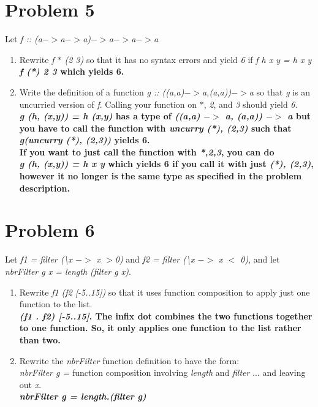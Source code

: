 \documentclass[a4paper, 12pt,fleqn]{article}
\begin{document}
\section*{Problem 5}
Let \textit{f :: (a$->$a$->$a)$->$a$->$a$->$a} 
\begin{enumerate}[label = (\alph*)]
\item Rewrite \textit{f $*$ (2 3)} so that it has no syntax errors and yield \textit{6} if \textit{f h x y = h x y}\\
\textbf{
\textit{f (*) 2 3} which yields 6.
}
\item Write the definition of a function \textit{g :: ((a,a)$->$a,(a,a))$->$a} so that \textit{g} is an uncurried version of \textit{f}. Calling your function on $*$, \textit{2}, and \textit{3} should yield \textit{6}.\\
\textbf{
\textit{g (h, (x,y)) = h (x,y)} has a type of \textit{((a,a) $->$ a, (a,a)) $->$ a} but you have to call the function with \textit{uncurry (*), (2,3)} such that \textit{g(uncurry (*), (2,3))} yields 6.\\
If you want to just call the function with \textit{*,2,3}, you can do\\ \textit{g (h, (x,y)) = h x y} which yields 6 if you call it with just \textit{(*), (2,3)}, however it no longer is the same type as specified in the problem description.
}
\end{enumerate}
\section*{Problem 6}
Let \textit{f1 = filter (\textbackslash x $->$ x $>$0)} and \textit{f2 = filter (\textbackslash x $->$ x $<$ 0)}, and let \\\textit{nbrFilter g x = length (filter g x)}.
\begin{enumerate}[label = (\alph*)]
\item Rewrite \textit{f1 (f2 [-5..15])} so that it uses function composition to apply just one function to the list.\\
\textbf{
\textit{(f1 . f2) [-5..15]}. The infix dot combines the two functions together to one function. So, it only applies one function to the list rather than two.
}
\item Rewrite the \textit{nbrFilter} function definition to have the form:\\
\textit{nbrFilter g =} function composition involving \textit{length} and \textit{filter} ... and leaving out \textit{x}.\\
\textbf{
\textit{nbrFilter g = length.(filter g)}
}
\end{enumerate}
\end{document}
